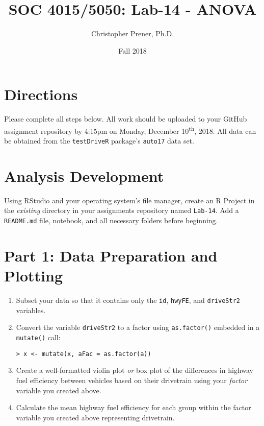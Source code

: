 \documentclass{tufte-handout}
\title{SOC 4015/5050: Lab-14 - ANOVA}
\author{Christopher Prener, Ph.D.}
\date{Fall 2018}
\begin{document}

\maketitle %


\vspace{5mm}
\section{Directions}
Please complete all steps below. All work should be uploaded to your GitHub assignment repository by 4:15pm on Monday, December 10\textsuperscript{th}, 2018. All data can be obtained from the \texttt{testDriveR} package's \texttt{auto17} data set.

\vspace{5mm}
\section{Analysis Development}
Using RStudio and your operating system's file manager, create an R Project in the \textit{existing} directory in your assignments repository named \texttt{Lab-14}. Add a \texttt{README.md} file, notebook, and all necessary folders before beginning.

\vspace{3mm}
\section{Part 1: Data Preparation and Plotting}
\begin{enumerate}
\item Subset your data so that it contains only the \texttt{id}, \texttt{hwyFE}, and \texttt{driveStr2} variables.
\item Convert the variable \texttt{driveStr2} to a factor using \texttt{as.factor()} embedded in a \texttt{mutate()} call: 
\begin{verbatim}
> x <- mutate(x, aFac = as.factor(a))
\end{verbatim}
\item Create a well-formatted violin plot \textit{or} box plot of the differences in highway fuel efficiency between vehicles based on their drivetrain using your \textit{factor} variable you created above.
\item Calculate the mean highway fuel efficiency for each group within the factor variable you created above representing drivetrain.
\end{enumerate}
\end{document}
